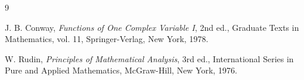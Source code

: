 \documentclass[12pt]{article}
\theoremstyle{definition}
\theoremstyle{remark}
\begin{document}
\begin{thebibliography}{9}

J. B. Conway,
\emph{Functions of One Complex Variable I},
2nd ed., Graduate Texts in Mathematics, vol. 11,
Springer-Verlag, New York, 1978.

W. Rudin,
\emph{Principles of Mathematical Analysis},
3rd ed., International Series in Pure and Applied Mathematics,
McGraw-Hill, New York, 1976.

\end{thebibliography}
\end{document}
